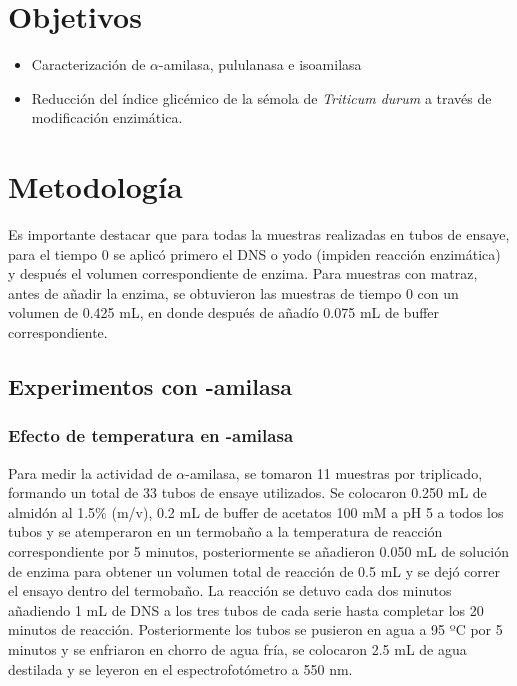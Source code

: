 \documentclass{article}
\begin{document}
\section{Objetivos}
\begin{itemize}
	\item Caracterización  de $\alpha$-amilasa, pululanasa e isoamilasa
	\item Reducción del índice glicémico de la sémola de \textit{Triticum durum} a través de modificación enzimática.	
\end{itemize}

\section{Metodología}

Es importante destacar que para todas la muestras realizadas en tubos de ensaye, para el tiempo 0 se aplicó primero el DNS o yodo (impiden reacción enzimática) y después el volumen correspondiente de enzima. Para muestras con matraz, antes de añadir la enzima, se obtuvieron las muestras de tiempo  0 con un volumen de 0.425 mL, en donde después de añadío 0.075 mL de buffer correspondiente.

\subsection{ Experimentos con \bm{$\alpha$}-amilasa}

\subsubsection{Efecto de temperatura en \bm{$\alpha$}-amilasa}
Para medir la actividad de $\alpha$-amilasa, se tomaron 11 muestras por triplicado, formando un total de 33 tubos de ensaye utilizados. Se colocaron 0.250 mL de almidón al 1.5\% (m/v), 0.2 mL de buffer de acetatos 100 mM a pH 5 a todos los tubos y se atemperaron en un termobaño a la temperatura de reacción correspondiente por 5 minutos, posteriormente se añadieron 0.050 mL de solución de enzima  para obtener un volumen total de reacción de 0.5 mL y se dejó correr el ensayo dentro del termobaño. La reacción se detuvo cada dos minutos añadiendo 1 mL de DNS a los tres tubos de cada serie hasta completar los 20 minutos de reacción. Posteriormente los tubos se pusieron en agua a 95 ºC por 5 minutos y se enfriaron en chorro de agua fría, se colocaron 2.5 mL de agua destilada y se leyeron en el espectrofotómetro a 550 nm.\\
\end{document}
